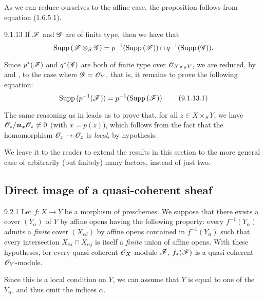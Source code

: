 As we can reduce ourselves to the affine case, the proposition follows from
equation (1.6.5.1).

\begin{envs}[Corollary]{9.1.13}
\label{cor-1.9.1.13}
If $\mathscr{F}$ and $\mathscr{G}$ are of finite type, then we have that
\[
  {\mathop{\mathrm{Supp}}\nolimits}\,(\mathscr{F}\otimes_S\mathscr{G})=p^{-1}({\mathop{\mathrm{Supp}}\nolimits}\,(\mathscr{F}))\cap q^{-1}({\mathop{\mathrm{Supp}}\nolimits}\,(\mathscr{G})).
\]
\end{envs}

Since $p^*(\mathscr{F})$ and $q^*(\mathscr{G})$ are both of finite type over
$\mathscr{O}_{X\times_S Y}$, we are reduced, by  and , to
the case where $\mathscr{G}=\mathscr{O}_Y$, that is, it remains to prove the following
equation:
\[
  {\mathop{\mathrm{Supp}}\nolimits}\,(p^{-1}(\mathscr{F}))=p^{-1}({\mathop{\mathrm{Supp}}\nolimits}\,(\mathscr{F})).
  \tag{9.1.13.1}
\]

The same reasoning as in  leads us to prove that, for all
$z\in X\times_S Y$, we have $\mathscr{O}_z/\mathfrak{m}_x\mathscr{O}_z\neq0$ (with $x=p(z)$),
which follows from the fact that the homomorphism $\mathscr{O}_x\to\mathscr{O}_z$ is \emph{local},
by hypothesis.

We leave it to the reader to extend the results in this section to the more
general case of arbitrarily (but finitely) many factors, instead of just two.

\subsection{Direct image of a quasi-coherent sheaf}
\label{1-schemes-9.2}

\begin{envs}[Proposition]{9.2.1}
\label{prop-1.9.2.1}
Let $f:X\to Y$ be a morphism of
preschemes. We suppose that there exists a cover $(Y_\alpha)$ of $Y$ by affine
opens having the following property: every $f^{-1}(Y_\alpha)$ admits a
\emph{finite} cover $(X_{\alpha i})$ by affine opens contained in
$f^{-1}(Y_\alpha)$ such that every intersection $X_{\alpha i}\cap X_{\alpha j}$
is itself a \emph{finite} union of affine opens. With these hypotheses, for
every quasi-coherent $\mathscr{O}_X$-module $\mathscr{F}$, $f_*(\mathscr{F})$ is a
quasi-coherent $\mathscr{O}_Y$-module.
\end{envs}

Since this is a local condition on $Y$, we can assume that $Y$ is equal to one
of the $Y_\alpha$, and thus omit the indices $\alpha$.

